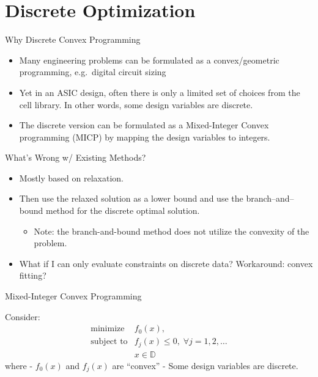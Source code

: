 \documentclass[10pt,ignorenonframetext,serif,onlymath]{beamer}
\providecommand{\tightlist}{%
  \setlength{\itemsep}{0pt}\setlength{\parskip}{0pt}}
\begin{document}
\hypertarget{sec:discrete-optimization}{%
\section{Discrete Optimization}\label{sec:discrete-optimization}}

\begin{frame}{Why Discrete Convex Programming}
\protect\hypertarget{sec:why-discrete-convex-programming}{}

\begin{itemize}
\item
  Many engineering problems can be formulated as a convex/geometric
  programming, e.g.~digital circuit sizing
\item
  Yet in an ASIC design, often there is only a limited set of choices
  from the cell library. In other words, some design variables are
  discrete.
\item
  The discrete version can be formulated as a Mixed-Integer Convex
  programming (MICP) by mapping the design variables to integers.
\end{itemize}

\end{frame}

\begin{frame}{What’s Wrong w/ Existing Methods?}
\protect\hypertarget{sec:whats-wrong-w-existing-methods}{}

\begin{itemize}
\item
  Mostly based on relaxation.
\item
  Then use the relaxed solution as a lower bound and use the
  branch–and–bound method for the discrete optimal solution.

  \begin{itemize}
  \tightlist
  \item
    Note: the branch-and-bound method does not utilize the convexity of
    the problem.
  \end{itemize}
\item
  What if I can only evaluate constraints on discrete data? Workaround:
  convex fitting?
\end{itemize}

\end{frame}

\begin{frame}{Mixed-Integer Convex Programming}
\protect\hypertarget{sec:mixed-integer-convex-programming}{}

Consider: \[\begin{array}{ll}
        \text{minimize}      & f_0(x), \\
        \text{subject to}    & f_j(x) \leq 0, \; \forall j=1,2,\ldots \\
                             & x \in \mathbb{D} 
\end{array}\] where - \(f_0(x)\) and \(f_j(x)\) are “convex” - Some
design variables are discrete.

\end{frame}
\end{document}
